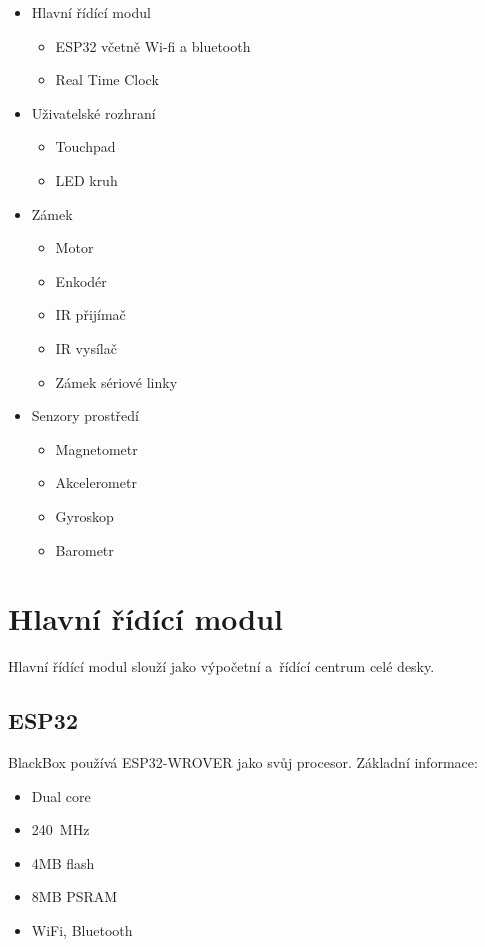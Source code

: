 \begin{itemize}[noitemsep]
    \item Hlavní řídící modul
        \begin{itemize}[noitemsep]
            \item ESP32 včetně Wi-fi a bluetooth
            \item Real Time Clock
        \end{itemize}
    \item Uživatelské rozhraní
          \begin{itemize}[noitemsep]
              \item Touchpad
              \item LED kruh
          \end{itemize}
    \item Zámek
        \begin{itemize}[noitemsep]
            \item Motor
            \item Enkodér
            \item IR přijímač
            \item IR vysílač
            \item Zámek sériové linky
        \end{itemize}
    \item Senzory prostředí
          \begin{itemize}[noitemsep]
              \item Magnetometr
              \item Akcelerometr
              \item Gyroskop
              \item Barometr
          \end{itemize}
\end{itemize}

\newpage
\section{Hlavní řídící modul}
Hlavní řídící modul slouží jako výpočetní a~řídící centrum celé desky.

\subsection{ESP32}
BlackBox používá ESP32-WROVER jako svůj procesor.
Základní informace:
\begin{itemize}
    \item Dual core
    \item 240~MHz
    \item 4MB flash
    \item 8MB PSRAM
    \item WiFi, Bluetooth
\end{itemize}

